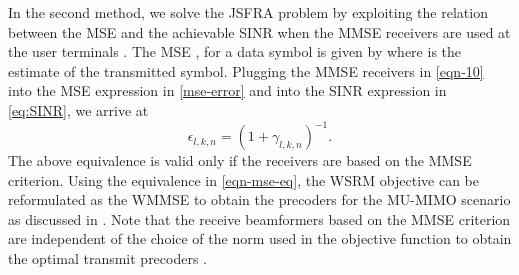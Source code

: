 In the second method, we solve the \ac{JSFRA} problem by exploiting the relation between the \ac{MSE} and the achievable \ac{SINR} when the \ac{MMSE} receivers are used at the user terminals \cite{mse_duality,christensen2008weighted}. The \ac{MSE} , for a data symbol  is given by
\iftoggle{single_column}{
\begin{equation} \label{mse-error}
	\mathbb{E} \big [ ( d_{l,k,n} - \hat{d}_{l,k,n} )^2 \big ] = \left | 1 - \mvec{w}{l,k,n}^\herm \mvec{H}{b_k,k,n} \mvec{m}{l,k,n} \right |^2 + \sum_{\mathclap{(j,i) \neq (l,k)}} \left | \mvec{w}{l,k,n}^\herm \mvec{H}{b_i,k,n} \mvec{m}{j,i,n} \right |^2 + \enoise = \epsilon_{l,k,n}
\end{equation}}{\allowdisplaybreaks
\begin{multline} \label{mse-error}
 \mathbb{E} \big [ ( d_{l,k,n} - \hat{d}_{l,k,n} )^2 \big ] = \left | 1 - \mvec{w}{l,k,n}^\herm \mvec{H}{b_k,k,n} \mvec{m}{l,k,n} \right |^2 \\
 + \sum_{\mathclap{(j,i) \neq (l,k)}} \left | \mvec{w}{l,k,n}^\herm \mvec{H}{b_i,k,n} \mvec{m}{j,i,n} \right |^2 + \enoise = \epsilon_{l,k,n}
\end{multline}}
where  is the estimate of the transmitted symbol. Plugging the \ac{MMSE} receivers in \eqref{eqn-10} into the \ac{MSE} expression in \eqref{mse-error} and into the \ac{SINR} expression in \eqref{eq:SINR}, we arrive at 
\begin{equation} \label{eqn-mse-eq}
\epsilon_{l,k,n} = (1 + \gamma_{l,k,n})^{-1}.
\end{equation}
The above equivalence is valid only if the receivers are based on the \ac{MMSE} criterion. Using the equivalence in \eqref{eqn-mse-eq}, the \ac{WSRM} objective can be reformulated as the \ac{WMMSE} to obtain the precoders for the \acs{MU}-\acs{MIMO} scenario as discussed in \cite{christensen2008weighted,wmmse_shi,kaleva2012weighted}. Note that the receive beamformers based on the \ac{MMSE} criterion are independent of the choice of the  norm used in the objective function to obtain the optimal transmit precoders .

